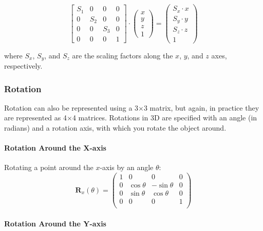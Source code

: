 \documentclass[12pt]{article}
\begin{document}
\[
    \begin{bmatrix}
        {S_1} & 0     & 0     & 0 \\
        0     & {S_2} & 0     & 0 \\
        0     & 0     & {S_3} & 0 \\
        0     & 0     & 0     & 1
    \end{bmatrix} \cdot
    \begin{pmatrix} x \\ y \\ z \\ 1 \end{pmatrix} =
    \begin{pmatrix} {S_x} \cdot x \\ {S_y} \cdot y \\ {S_z} \cdot z \\ 1 \end{pmatrix}
\]

where \( S_x \), \( S_y \), and \( S_z \) are the scaling factors along the \( x \), \( y \), and \( z \) axes, respectively.

\subsubsection{Rotation}

Rotation can also be represented using a 3$\times$3 matrix, but again, in practice they are represented as 4$\times$4 matrices.
Rotations in 3D are specified with an angle (in radians) and a rotation axis, with which you rotate the object around.


\paragraph{Rotation Around the X-axis}

Rotating a point around the \(x\)-axis by an angle \(\theta\):
\[
    \mathbf{R}_x(\theta) = \begin{pmatrix}
        1 & 0           & 0            & 0 \\
        0 & \cos \theta & -\sin \theta & 0 \\
        0 & \sin \theta & \cos \theta  & 0 \\
        0 & 0           & 0            & 1 \\
    \end{pmatrix}
\]


\paragraph{Rotation Around the Y-axis}
\end{document}

